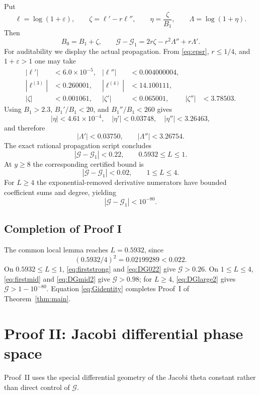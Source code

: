 \documentclass{amsart}
\numberwithin{equation}{section}
\theoremstyle{definition}
\theoremstyle{remark}
\newcommand{\Gcal}{\mathcal G}
\begin{document}
Put
\begin{equation}\label{eq:pertvars}
 \ell=\log(1+\varepsilon),\qquad
 \zeta=\ell'-r\ell'',\qquad
 \eta=\frac{\zeta}{B_1},\qquad
 \Lambda=\log(1+\eta).
\end{equation}
Then
\begin{equation}\label{eq:DGexact}
 B_0=B_1+\zeta,
 \qquad
 \Gcal-\Gcal_1=2r\zeta-r^2\Lambda''+r\Lambda'.
\end{equation}
For auditability we display the actual propagation.  From \eqref{eq:epsr}, $r\le1/4$, and $1+\varepsilon>1$ one may take
\begin{align*}
 |\ell'|&<6.0\times10^{-5},&
 |\ell''|&<0.004000004,\\
 |\ell^{(3)}|&<0.260001,&
 |\ell^{(4)}|&<14.100111,\\
 |\zeta|&<0.001061,&
 |\zeta'|&<0.065001,&
 |\zeta''|&<3.78503.
\end{align*}
Using $B_1>2.3$, $B_1'/B_1<20$, and $B_1''/B_1<260$ gives
\[
 |\eta|<4.61\times10^{-4},\quad
 |\eta'|<0.03748,\quad
 |\eta''|<3.26463,
\]
and therefore
\[
 |\Lambda'|<0.03750,\qquad |\Lambda''|<3.26754.
\]
The exact rational propagation script  concludes
\begin{equation}\label{eq:DG022}
 \boxed{\quad |\Gcal-\Gcal_1|<0.22,
 \qquad0.5932\le L\le1.\quad}
\end{equation}
At $y\ge8$ the corresponding certified bound is
\begin{equation}\label{eq:DGmid2}
 |\Gcal-\Gcal_1|<0.02,\qquad1\le L\le4.
\end{equation}
For $L\ge4$ the exponential-removed derivative numerators have bounded coefficient sums and degree, yielding
\begin{equation}\label{eq:DGlarge2}
 |\Gcal-\Gcal_1|<10^{-80}.
\end{equation}

\subsection{Completion of Proof I}
The common local lemma reaches $L=0.5932$, since
\[
 (0.5932/4)^2=0.02199289<0.022.
\]
On $0.5932\le L\le1$, \eqref{eq:firststrong} and \eqref{eq:DG022} give $\Gcal>0.26$.  On $1\le L\le4$, \eqref{eq:firstmid} and \eqref{eq:DGmid2} give $\Gcal>0.98$; for $L\ge4$, \eqref{eq:DGlarge2} gives $\Gcal>1-10^{-80}$.  Equation \eqref{eq:Gidentity} completes Proof~I of Theorem~\ref{thm:main}.

\section{Proof II: Jacobi differential phase space}
Proof~II uses the special differential geometry of the Jacobi theta constant rather than direct control of $\Gcal$.
\end{document}
